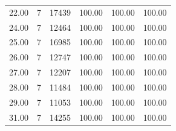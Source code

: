 \begin{table}[ht]
\begin{tabular}{rrrrrr}
  22.00 &   7 & 17439 & 100.00 & 100.00 & 100.00 \\ 
  24.00 &   7 & 12464 & 100.00 & 100.00 & 100.00 \\ 
  25.00 &   7 & 16985 & 100.00 & 100.00 & 100.00 \\ 
  26.00 &   7 & 12747 & 100.00 & 100.00 & 100.00 \\ 
  27.00 &   7 & 12207 & 100.00 & 100.00 & 100.00 \\ 
  28.00 &   7 & 11484 & 100.00 & 100.00 & 100.00 \\ 
  29.00 &   7 & 11053 & 100.00 & 100.00 & 100.00 \\ 
  31.00 &   7 & 14255 & 100.00 & 100.00 & 100.00 \\ 
   \bottomrule
\end{tabular}
\end{table}

